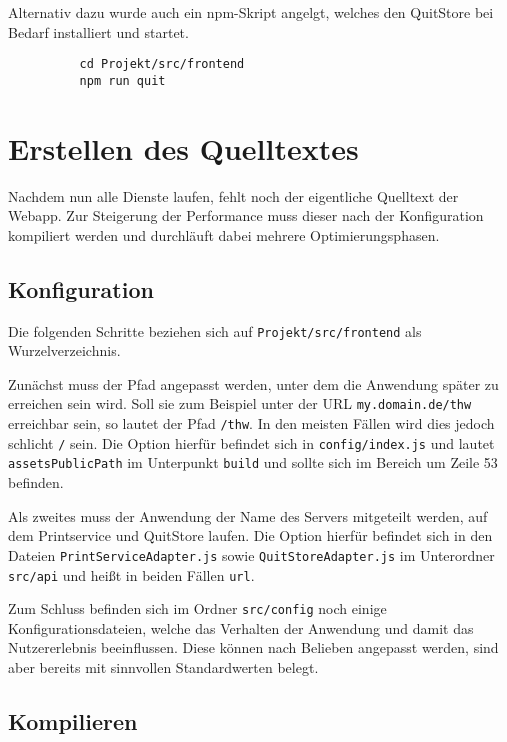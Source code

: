 \documentclass[a4paper,11pt,oneside, titlepage]{article}
\begin{document}
        Alternativ dazu wurde auch ein npm-Skript angelgt, welches den QuitStore bei Bedarf installiert
        und startet.

        \begin{lstlisting}
          cd Projekt/src/frontend
          npm run quit \end{lstlisting}

  \section{Erstellen des Quelltextes}

    Nachdem nun alle Dienste laufen, fehlt noch der eigentliche Quelltext der Webapp. Zur Steigerung
    der Performance muss dieser nach der Konfiguration kompiliert werden und durchläuft dabei mehrere Optimierungsphasen.

    \subsection{Konfiguration}

      Die folgenden Schritte beziehen sich auf \verb+Projekt/src/frontend+ als Wurzelverzeichnis.

      Zunächst muss der Pfad angepasst werden, unter dem die Anwendung später zu erreichen sein wird.
      Soll sie zum Beispiel unter der URL \verb+my.domain.de/thw+ erreichbar sein, so lautet der Pfad
      \verb+/thw+. In den meisten Fällen wird dies jedoch schlicht \verb+/+ sein. Die Option hierfür befindet
      sich in \verb+config/index.js+ und lautet \verb+assetsPublicPath+ im Unterpunkt \verb+build+ und sollte
      sich im Bereich um Zeile 53 befinden.

      Als zweites muss der Anwendung der Name des Servers mitgeteilt werden, auf dem Printservice und QuitStore laufen.
      Die Option hierfür befindet sich in den Dateien \verb+PrintServiceAdapter.js+ sowie \verb+QuitStoreAdapter.js+ im
      Unterordner \verb+src/api+ und heißt in beiden Fällen \verb+url+.

      Zum Schluss befinden sich im Ordner \verb+src/config+ noch einige Konfigurationsdateien, welche das Verhalten
      der Anwendung und damit das Nutzererlebnis beeinflussen. Diese können nach Belieben angepasst werden, sind aber
      bereits mit sinnvollen Standardwerten belegt.

    \subsection{Kompilieren}
\end{document}
